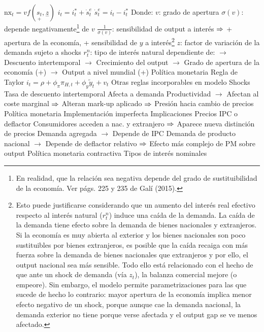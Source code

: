 \documentclass{nuevotema}
\begin{document}
\begin{esquemal}
				\4[NX] $\text{nx}_t = v f( \underset{+}{s_t}, \underset{-}{z})$
				\4[UIP] $i_t = i_t^* + \dot{s}_t^e$
				\4[UIP] $\dot{s}_t^e  = i_t - i_t^*$
				\4[] Donde:
				\4[] $v$: grado de apertura
				\4[] $\sigma(v)$: depende negativamente\footnote{En realidad, que la relación sea negativa depende del grado de sustituibilidad de la economía. Ver págs. 225 y 235 de Galí (2015).} de $v$
				\4[] $\frac{1}{\sigma(v)}$: sensibilidad de output a interés
				\4[] $\Rightarrow$ + apertura de la economía, + sensibilidad de $y$ a interés\footnote{Esto puede justificarse considerando que un aumento del interés real efectivo respecto al interés natural ($r_t^n$) induce una caída de la demanda. La caída de la demanda tiene efecto sobre la demanda de bienes nacionales y extranjeros. Si la economía es muy abierta al exterior y los bienes nacionales son poco sustituibles por bienes extranjeros, es posible que la caída recaiga con más fuerza sobre la demanda de bienes nacionales que extranjeros y por ello, el output nacional sea más sensible. Todo ello está relacionado con el hecho de que ante un shock de demanda (vía $z_t$), la balanza comercial mejore (o empeore). Sin embargo, el modelo permite parametrizaciones para las que sucede de hecho lo contrario: mayor apertura de la economía implica menor efecto negativo de un shock, porque aunque cae la demanda nacional, la demanda exterior no tiene porque verse afectada y el output gap se ve menos afectado. }
				\4[] $z$: factor de variación de la demanda sujeto a shocks
				\4[] $r_t^n$: tipo de interés natural dependiente de:
				\4[] $\to$ Descuento intertemporal
				\4[] $\to$ Crecimiento del output
				\4[] $\to$ Grado de apertura de la economía (+)
				\4[] $\to$ Output a nivel mundial (+)
			\3 Política monetaria
				\4 Regla de Taylor
				\4[] $i_t = \rho + \phi_\pi \pi_{H,t} + \phi_y \tilde{y}_t+v_t$
				\4 Otras reglas incorporables en modelo
			\3 Shocks
				\4 Tasa de descuento intertemporal
				\4[] Afecta a demanda
				\4 Productividad
				\4[] $\to$ Afectan al coste marginal
				\4[] $\Rightarrow$ Alteran mark-up aplicado
				\4[] $\Rightarrow$ Presión hacia cambio de precios
				\4 Política monetaria
				\4[] Implementación imperfecta
		\2 Implicaciones
			\3 Precios
				\4 IPC o deflactor
				\4[] Consumidores acceden a nac. y extranjero
				\4[] $\Rightarrow$ Aparece nueva distinción de precios
				\4[] Demanda agregada
				\4[] $\to$ Depende de IPC
				\4[] Demanda de producto nacional
				\4[] $\to$ Depende de deflactor relativo
				\4[] $\Rightarrow$ Efecto más complejo de PM sobre output
			\3 Política monetaria contractiva
				\4 Tipos de interés nominales

\end{esquemal}
\end{document}
